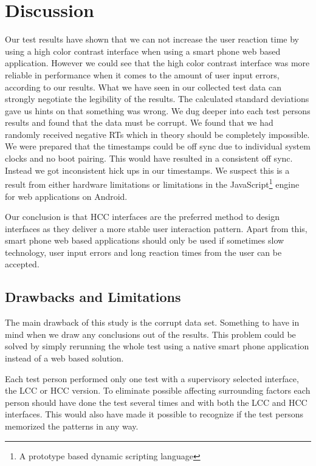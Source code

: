 \documentclass[runningheads,a4paper]{llncs}
\begin{document}
\section{Discussion}\label{sec:discussion}
Our test results have shown that we can not increase the user reaction time by using a high color contrast interface when using a smart phone web based application. However we could see that the high color contrast interface was more reliable in performance when it comes to the amount of user input errors, according to our results. What we have seen in our collected test data can strongly negotiate the legibility of the results. The calculated standard deviations gave us hints on that something was wrong. We dug deeper into each test persons results and found that the data must be corrupt. We found that we had randomly received negative RTs which in theory should be completely impossible. We were prepared that the timestamps could be off sync due to individual system clocks and no boot pairing. This would have resulted in a consistent off sync. Instead we got inconsistent hick ups in our timestamps. We suspect this is a result from either hardware limitations or limitations in the JavaScript\footnote{A prototype based dynamic scripting language} engine for web applications on Android.

Our conclusion is that HCC interfaces are the preferred method to design interfaces as they deliver a more stable user interaction pattern. Apart from this, smart phone web based applications should only be used if sometimes slow technology, user input errors and long reaction times from the user can be accepted.

\subsection{Drawbacks and Limitations}\label{subsec:drawbacks}
The main drawback of this study is the corrupt data set. Something to have in mind when we draw any conclusions out of the results. This problem could be solved by simply rerunning the whole test using a native smart phone application instead of a web based solution.

Each test person performed only one test with a supervisory selected interface, the LCC or HCC version. To eliminate possible affecting surrounding factors each person should have done the test several times and with both the LCC and HCC interfaces. This would also have made it possible to recognize if the test persons memorized the patterns in any way.
\end{document}
